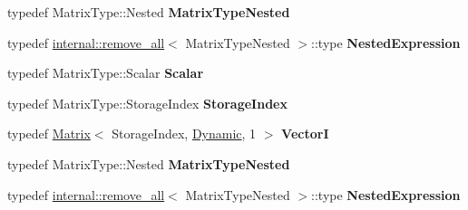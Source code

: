 \begin{DoxyCompactItemize}
typedef Matrix\+Type\+::\+Nested {\bfseries Matrix\+Type\+Nested}
\item 
\mbox{\label{class_eigen_1_1_sparse_symmetric_permutation_product_af9780ec2cd4a63ace8e83c3128ac71bf}} 
typedef \hyperlink{struct_eigen_1_1internal_1_1remove__all}{internal\+::remove\+\_\+all}$<$ Matrix\+Type\+Nested $>$\+::type {\bfseries Nested\+Expression}
\item 
\mbox{\label{class_eigen_1_1_sparse_symmetric_permutation_product_a3c747f700e8423db88fef150c2a282ec}} 
typedef Matrix\+Type\+::\+Scalar {\bfseries Scalar}
\item 
\mbox{\label{class_eigen_1_1_sparse_symmetric_permutation_product_a1d2ee3395263f4c835ee4296368ac731}} 
typedef Matrix\+Type\+::\+Storage\+Index {\bfseries Storage\+Index}
\item 
\mbox{\label{class_eigen_1_1_sparse_symmetric_permutation_product_a1d2d670e84b37851b9568ceae8f981ed}} 
typedef \hyperlink{group___core___module_class_eigen_1_1_matrix}{Matrix}$<$ Storage\+Index, \hyperlink{namespace_eigen_ad81fa7195215a0ce30017dfac309f0b2}{Dynamic}, 1 $>$ {\bfseries VectorI}
\item 
\mbox{\label{class_eigen_1_1_sparse_symmetric_permutation_product_a099934ac338e7299e4e61e4ddedf42e8}} 
typedef Matrix\+Type\+::\+Nested {\bfseries Matrix\+Type\+Nested}
\item 
\mbox{\label{class_eigen_1_1_sparse_symmetric_permutation_product_af9780ec2cd4a63ace8e83c3128ac71bf}} 
typedef \hyperlink{struct_eigen_1_1internal_1_1remove__all}{internal\+::remove\+\_\+all}$<$ Matrix\+Type\+Nested $>$\+::type {\bfseries Nested\+Expression}
\end{DoxyCompactItemize}
